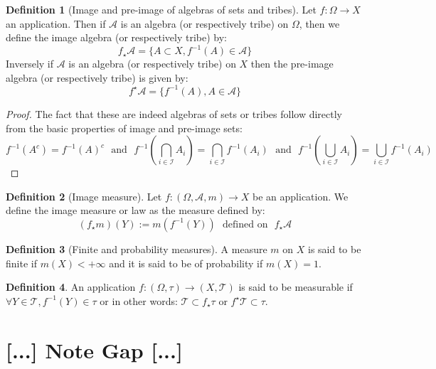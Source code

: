 \documentclass[10pt,a4paper]{book}
\theoremstyle{definition}
\newtheorem{definition}{Definition}[section]
\begin{document}
\begin{definition}[Image and pre-image of algebras of sets and tribes]

Let $f : \Omega \to X$ an application. Then if $\mathcal{A}$ is an algebra (or respectively tribe) on $\Omega$, then we define the image algebra (or respectively tribe) by:
\[
f_\star \mathcal{A} = \{ A \subset X, f^{-1}(A) \in \mathcal{A}\}
\]
Inversely if $\mathcal{A}$ is an algebra (or respectively tribe) on $X$ then the pre-image algebra (or respectively tribe) is given by:
\[
f^\star \mathcal{A} = \{ f^{-1}(A), A \in \mathcal{A}\}
\]

\end{definition}

\begin{proof}
The fact that these are indeed algebras of sets or tribes follow directly from the basic properties of image and pre-image sets:
\[
f^{-1}(A^c) = f^{-1}(A)^c \mbox{~~and~~} f^{-1}(\bigcap_{i \in \mathcal{I}} A_i) = \bigcap_{i \in \mathcal{I}} f^{-1}(A_i) \mbox{~~and~~} f^{-1}(\bigcup_{i \in \mathcal{I}} A_i) = \bigcup_{i \in \mathcal{I}} f^{-1}(A_i)
\]
\end{proof}

\begin{definition}[Image measure]

Let $f : (\Omega, \mathcal{A}, m) \to X$ be an application. We define the image measure or law as the measure defined by:
\[
(f_\star m)( Y) := m(f^{-1}(Y)) \mbox{~~defined on~~} f_\star \mathcal{A}
\]

\end{definition}

\begin{definition}[Finite and probability measures]

A measure $m$ on $X$ is said to be finite if $m(X) < +\infty$ and it is said to be of probability if $m(X) = 1$. 

\end{definition}

\begin{definition}

An application $f: (\Omega, \tau) \to (X, \mathcal{T})$ is said to be measurable if $\forall Y \in \mathcal{T}, f^{-1}(Y) \in \tau$ or in other words: $\mathcal{T} \subset f_\star \tau$ or $f^\star \mathcal{T} \subset \tau$. 
\end{definition}

\chapter{[...] Note Gap [...]}
\end{document}
